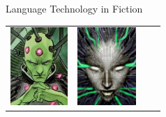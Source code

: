 \documentclass[xcolor={usenames,svgnames,x11names,dvipsnames,table}]{beamer}
\begin{document}
\begin{frame}{Language Technology in Fiction}
\begin{center}
\begin{tabular}{cccc}
            \includegraphics[height=8em]{./img/brainiac} &
            \includegraphics[height=8em]{./img/shodan}
        \end{tabular}
    \end{center}
\end{frame}
\end{document}
